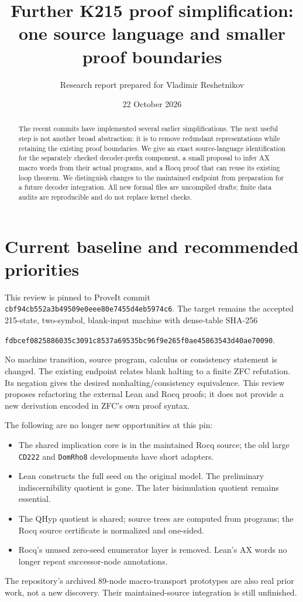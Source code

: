 \documentclass[11pt]{article}
\title{Further K215 proof simplification:\\one source language and smaller proof boundaries}
\author{Research report prepared for Vladimir Reshetnikov}
\date{22 October 2026}
\begin{document}
\maketitle
\begin{abstract}
The recent commits have implemented several earlier simplifications. The next useful step is not another broad abstraction: it is to remove redundant representations while retaining the existing proof boundaries. We give an exact source-language identification for the separately checked decoder-prefix component, a small proposal to infer AX macro words from their actual programs, and a Rocq proof that can reuse its existing loop theorem. We distinguish changes to the maintained endpoint from preparation for a future decoder integration. All new formal files are uncompiled drafts; finite data audits are reproducible and do not replace kernel checks.
\end{abstract}

\section{Current baseline and recommended priorities}
This review is pinned to ProveIt commit
\texttt{cbf94cb552a3b49509e0eee80e7455d4eb5974c6}.
The target remains the accepted 215-state, two-symbol, blank-input machine with dense-table SHA-256
\begin{center}\small
\texttt{fdbcef0825886035c3091c8537a69535bc96f9e265f0ae45863543d40ae70090}.
\end{center}
No machine transition, source program, calculus or consistency statement is changed.
The existing endpoint relates blank halting to a finite ZFC refutation. Its negation gives the desired nonhalting/consistency equivalence. This review proposes refactoring the external Lean and Rocq proofs; it does not provide a new derivation encoded in ZFC's own proof syntax.

The following are no longer new opportunities at this pin:
\begin{itemize}
\item The shared implication core is in the maintained Rocq source; the old large \texttt{CD222} and \texttt{DomRho8} developments have short adapters.
\item Lean constructs the full seed on the original model. The preliminary indiscernibility quotient is gone. The later bisimulation quotient remains essential.
\item The QHyp quotient is shared; source trees are computed from programs; the Rocq source certificate is normalized and one-sided.
\item Rocq's unused zero-seed enumerator layer is removed. Lean's AX words no longer repeat successor-node annotations.
\end{itemize}
The repository's archived 89-node macro-transport prototypes are also real prior work, not a new discovery. Their maintained-source integration is still unfinished.
\end{document}
